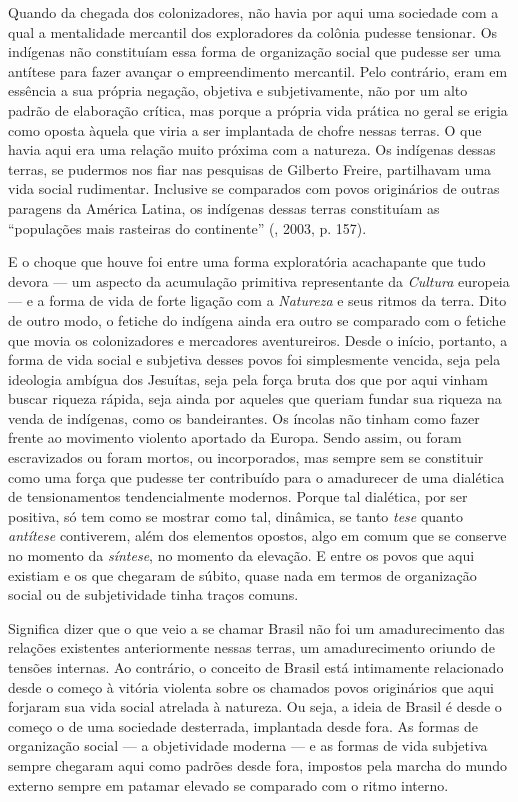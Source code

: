 Quando da
chegada dos colonizadores, não havia por aqui uma sociedade com a qual a
mentalidade mercantil dos exploradores da colônia pudesse tensionar. Os
indígenas não constituíam essa forma de organização social que pudesse
ser uma antítese para fazer avançar o empreendimento mercantil. Pelo
contrário, eram em essência a sua própria negação, objetiva e
subjetivamente, não por um alto padrão de elaboração crítica, mas porque
a própria vida prática no geral se erigia como oposta àquela que viria a ser implantada
de chofre nessas terras. O que havia aqui era uma relação muito próxima
com a natureza. Os indígenas dessas terras, se pudermos nos fiar nas pesquisas de
Gilberto Freire, partilhavam uma vida social rudimentar. Inclusive se
comparados com povos originários de outras paragens da América Latina,
os indígenas dessas terras constituíam as ``populações mais rasteiras do
continente'' (, 2003, p. 157).

E o choque que houve foi entre uma forma exploratória acachapante que
tudo devora --- um aspecto da acumulação primitiva representante da
\emph{Cultura} europeia --- e a forma de vida de forte ligação com a
\emph{Natureza} e seus ritmos da terra. Dito de outro modo, o fetiche do
indígena ainda era outro se comparado com o fetiche que movia os
colonizadores e mercadores aventureiros. Desde o início, portanto, a
forma de vida social e subjetiva desses povos foi simplesmente vencida,
seja pela ideologia ambígua dos Jesuítas, seja pela força bruta dos que
por aqui vinham buscar riqueza rápida, seja ainda por aqueles que
queriam fundar sua riqueza na venda de indígenas, como os bandeirantes.
Os íncolas não tinham como fazer frente ao movimento violento aportado
da Europa. Sendo assim, ou foram escravizados ou foram mortos, ou
incorporados, mas sempre sem se constituir como uma força que pudesse
ter contribuído para o amadurecer de uma dialética de tensionamentos
tendencialmente modernos. Porque tal dialética, por ser positiva, só tem
como se mostrar como tal, dinâmica, se tanto \emph{tese} quanto
\emph{antítese} contiverem, além dos elementos opostos, algo em comum
que se conserve no momento da \emph{síntese}, no momento da elevação. E
entre os povos que aqui existiam e os que chegaram de súbito, quase nada
em termos de organização social ou de subjetividade tinha traços comuns.

Significa dizer que o que veio a se chamar Brasil não foi um
amadurecimento das relações existentes anteriormente nessas terras, um
amadurecimento oriundo de tensões internas. Ao contrário, o conceito de
Brasil está intimamente relacionado desde o começo à vitória violenta
sobre os chamados povos originários que aqui forjaram sua vida social
atrelada à natureza. Ou seja, a ideia de Brasil é desde o começo o de
uma sociedade desterrada, implantada desde fora. As formas de
organização social --- a objetividade moderna --- e as formas de vida
subjetiva sempre chegaram aqui como padrões desde fora, impostos pela
marcha do mundo externo sempre em patamar elevado se comparado com o
ritmo interno.

